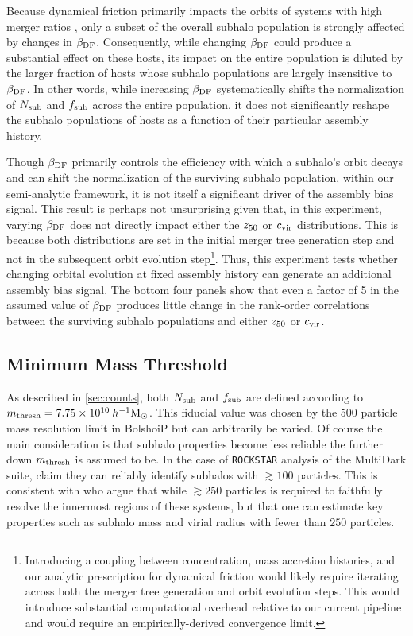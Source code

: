 \documentclass[twocolumn,apj,numberedappendix,twocolappendix,iop]{openjournal}
\begin{document}
Because dynamical friction primarily impacts the orbits of systems with high merger ratios \citep{vdBosch.99}, only a subset of the overall subhalo population is strongly affected by changes in $\beta_{\rm DF}$. Consequently, while changing $\beta_{\rm DF}$ could produce a substantial effect on these hosts, its impact on the entire population is diluted by the larger fraction of hosts whose subhalo populations are largely insensitive to $\beta_{\rm DF}$. In other words, while increasing $\beta_{\rm DF}$ systematically shifts the normalization of $N_{\rm sub}$ and $f_{\rm sub}$ across the entire population, it does not significantly reshape the subhalo populations of hosts as a function of their particular assembly history.

Though $\beta_{\rm DF}$ primarily controls the efficiency with which a subhalo's orbit decays and can shift the normalization of the surviving subhalo population, within our semi-analytic framework, it is not itself a significant driver of the assembly bias signal. This result is perhaps not unsurprising given that, in this experiment, varying $\beta_{\rm DF}$ does not directly impact either the $z_{50}$ or $c_{\rm vir}$ distributions. This is because both distributions are set in the initial merger tree generation step and not in the subsequent orbit evolution step\footnote{Introducing a coupling between concentration, mass accretion histories, and our analytic prescription for dynamical friction would likely require iterating across both the merger tree generation and orbit evolution steps. This would introduce substantial computational overhead relative to our current pipeline and would require an empirically-derived convergence limit.}. Thus, this experiment tests whether changing orbital evolution at fixed assembly history can generate an additional assembly bias signal. The bottom four panels show that even a factor of 5 in the assumed value of $\beta_{\rm DF}$ produces little change in the rank-order correlations between the surviving subhalo populations and either $z_{50}$ or $c_{\rm vir}$.


\subsection{Minimum Mass Threshold}
\label{sec:threshold}

As described in \ref{sec:counts}, both $N_{\rm sub}$ and $f_{\rm sub}$ are defined according to $m_{\rm thresh} = 7.75 \times 10^{10} \>h^{-1}\rm M_\odot$. This fiducial value was chosen by the 500 particle mass resolution limit in BolshoiP but can arbitrarily be varied. Of course the main consideration is that subhalo properties become less reliable the further down $m_{\rm thresh}$ is assumed to be. In the case of \texttt{ROCKSTAR} analysis of the MultiDark suite, \cite{RodriguezPuebla.etal.16} claim they can reliably identify subhalos with $\gtrsim 100$ particles. This is consistent with \cite{Klypin.etal.16} who argue that while $\gtrsim 250$ particles is required to faithfully resolve the innermost regions of these systems, but that one can estimate key properties such as subhalo mass and virial radius with fewer than $250$ particles.
\end{document}
